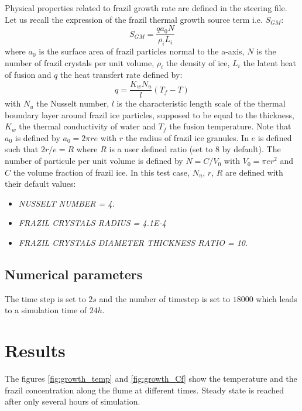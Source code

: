 Physical properties related to frazil growth rate are defined in the \khione steering file. Let us recall
the expression of the frazil thermal growth source term i.e. $S_{GM}$:
\begin{equation}
S_{GM} = \dfrac{q a_0 N}{\rho_i L_i}
\end{equation}
where $a_0$ is the surface area of frazil particles normal to the a-axis, $N$ is the number of frazil crystals
per unit volume, $\rho_i$ the density of ice, $L_i$ the latent heat of fusion and $q$ the heat transfert rate
defined by:
\begin{equation}
q = \dfrac{K_w N_u}{l} (T_f-T)
\end{equation}
with $N_u$ the Nusselt number, $l$ is the characteristic length scale of the thermal boundary layer around frazil ice particles, supposed to be equal to the thickness, $K_w$ the thermal conductivity of water and $T_f$ the fusion temperature. Note that $a_0$ is defined by $a_0 = 2 \pi r e$ with $r$ the radius of frazil ice granules. In \khione $e$ is defined such that $2 r/e = R$ where $R$ is a user defined ratio (set to $8$ by default). The number of particule per unit volume is defined by $N=C/V_0$ with $V_0=\pi e r^2$ and $C$ the volume fraction of frazil ice.
In this test case, $N_u$, $r$, $R$ are defined with their default values:
\begin{itemize}
	\item\textit{NUSSELT NUMBER = 4.}
	\item\textit{FRAZIL CRYSTALS RADIUS = 4.1E-4}
	\item\textit{FRAZIL CRYSTALS DIAMETER THICKNESS RATIO  = 10.}
\end{itemize}

\subsection{Numerical parameters}
The time step is set to $2s$ and the number of timestep is set to $18000$ which leads to a simulation time of $24h$.

\section{Results}
The figures \ref{fig:growth_temp} and \ref{fig:growth_Cf} show the temperature and the frazil concentration along the flume at different times. Steady state is reached after only several hours of simulation. 


